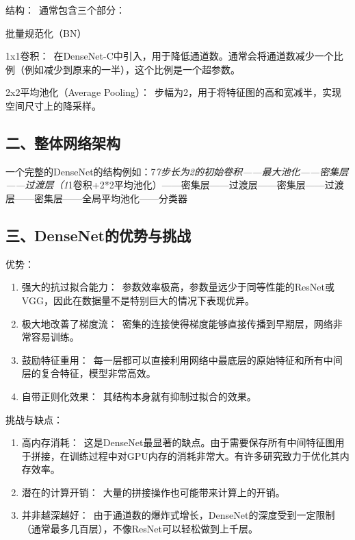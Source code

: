 结构：~通常包含三个部分：

批量规范化（BN）

1x1卷积：~在DenseNet-C中引入，用于降低通道数。通常会将通道数减少一个比例（例如减少到原来的一半），这个比例是一个超参数。

2x2平均池化（Average Pooling）：~步幅为2，用于将特征图的高和宽减半，实现空间尺寸上的降采样。

\hypertarget{ux4e8cux6574ux4f53ux7f51ux7edcux67b6ux6784}{%
\subsection{二、整体网络架构}\label{ux4e8cux6574ux4f53ux7f51ux7edcux67b6ux6784}}

一个完整的DenseNet的结构例如：7\emph{7步长为2的初始卷积------最大池化------密集层------过渡层（1}1卷积+2*2平均池化）------密集层------过渡层------密集层------过渡层------密集层------全局平均池化------分类器

\hypertarget{ux4e09densenetux7684ux4f18ux52bfux4e0eux6311ux6218}{%
\subsection{三、DenseNet的优势与挑战}\label{ux4e09densenetux7684ux4f18ux52bfux4e0eux6311ux6218}}

优势：

\begin{enumerate}
\def\labelenumi{\arabic{enumi}.}
\item
  强大的抗过拟合能力：~参数效率极高，参数量远少于同等性能的ResNet或VGG，因此在数据量不是特别巨大的情况下表现优异。
\item
  极大地改善了梯度流：~密集的连接使得梯度能够直接传播到早期层，网络非常容易训练。
\item
  鼓励特征重用：~每一层都可以直接利用网络中最底层的原始特征和所有中间层的复合特征，模型非常高效。
\item
  自带正则化效果：~其结构本身就有抑制过拟合的效果。
\end{enumerate}

挑战与缺点：

\begin{enumerate}
\def\labelenumi{\arabic{enumi}.}
\item
  高内存消耗：~这是DenseNet最显著的缺点。由于需要保存所有中间特征图用于拼接，在训练过程中对GPU内存的消耗非常大。有许多研究致力于优化其内存效率。
\item
  潜在的计算开销：~大量的拼接操作也可能带来计算上的开销。
\item
  并非越深越好：~由于通道数的爆炸式增长，DenseNet的深度受到一定限制（通常最多几百层），不像ResNet可以轻松做到上千层。
\end{enumerate}

